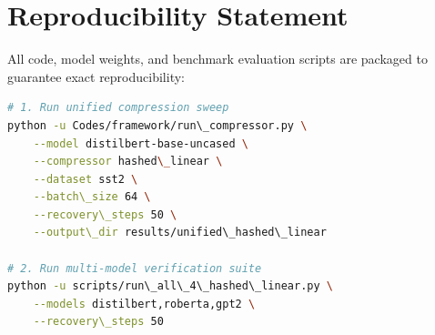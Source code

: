 \section{Reproducibility Statement}
All code, model weights, and benchmark evaluation scripts are packaged to guarantee exact reproducibility:
\begin{lstlisting}[language=bash]
# 1. Run unified compression sweep
python -u Codes/framework/run\_compressor.py \
    --model distilbert-base-uncased \
    --compressor hashed\_linear \
    --dataset sst2 \
    --batch\_size 64 \
    --recovery\_steps 50 \
    --output\_dir results/unified\_hashed\_linear

# 2. Run multi-model verification suite
python -u scripts/run\_all\_4\_hashed\_linear.py \
    --models distilbert,roberta,gpt2 \
    --recovery\_steps 50
\end{lstlisting}
